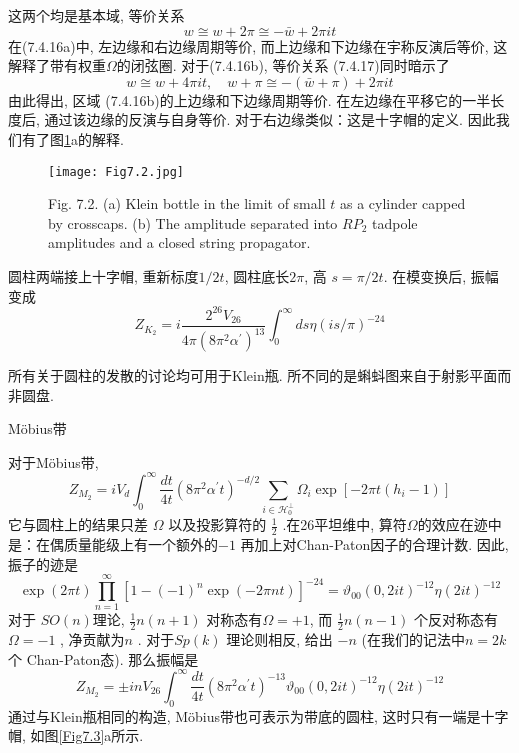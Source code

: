 这两个均是基本域, 等价关系
\begin{equation}
	w \cong w+2 \pi \cong-\bar{w}+2 \pi i t
\end{equation}
在(7.4.16a)中, 左边缘和右边缘周期等价, 而上边缘和下边缘在宇称反演后等价, 这解释了带有权重$\Omega $的闭弦圈. 对于(7.4.16b), 等价关系 (7.4.17)同时暗示了
\begin{equation}
	w \cong w+4 \pi i t, \quad w+\pi \cong-(\bar{w}+\pi)+2 \pi i t
\end{equation}
由此得出, 区域 (7.4.16b)的上边缘和下边缘周期等价. 在左边缘在平移它的一半长度后, 通过该边缘的反演与自身等价. 对于右边缘类似：这是十字帽的定义. 因此我们有了图\ref{Fig7.2}a的解释. \\
\begin{figure}
	\begin{center}
		\texttt{[image: Fig7.2.jpg]}\\
		\caption{Fig. 7.2. (a) Klein bottle in the limit of small $t$ as a cylinder capped by crosscaps. (b) The amplitude separated into $R P_{2}$ tadpole amplitudes and a closed string propagator.}\label{Fig7.2}
	\end{center}
\end{figure}

圆柱两端接上十字帽, 重新标度$1 / 2 t$, 圆柱底长$2 \pi$, 高 $s=\pi / 2 t$. 在模变换后, 振幅变成
\begin{equation}
	Z_{K_{2}}=i \frac{2^{26} V_{26}}{4 \pi\left(8 \pi^{2} \alpha^{\prime}\right)^{13}} \int_{0}^{\infty} d s \eta(i s / \pi)^{-24}
\end{equation}

所有关于圆柱的发散的讨论均可用于Klein瓶. 所不同的是蝌蚪图来自于射影平面而非圆盘.\\

\centerline{\Large Möbius带}
对于Möbius带,
\begin{equation}
	Z_{M_{2}}=i V_{d} \int_{0}^{\infty} \frac{d t}{4 t}\left(8 \pi^{2} \alpha^{\prime} t\right)^{-d / 2} \sum_{i \in \mathscr{H}_{0}^{\perp}} \Omega_{i} \exp \left[-2 \pi t\left(h_{i}-1\right)\right]
\end{equation}
它与圆柱上的结果只差 $\Omega$ 以及投影算符的 $\frac{1}{2}$ .在26平坦维中, 算符$\Omega$的效应在迹中是：在偶质量能级上有一个额外的$-1$ 再加上对Chan-Paton因子的合理计数. 因此, 振子的迹是
\begin{equation}
	\exp (2 \pi t) \prod_{n=1}^{\infty}\left[1-(-1)^{n} \exp (-2 \pi n t)\right]^{-24}=\vartheta_{00}(0,2 i t)^{-12} \eta(2 i t)^{-12}
\end{equation}
对于 $S O(n)$理论,  $\frac{1}{2} n(n+1)$ 对称态有$\Omega=+1$, 而 $\frac{1}{2} n(n-1)$ 个反对称态有 $\Omega=-1$ , 净贡献为$n$ . 对于$S p(k)$ 理论则相反, 给出 $-n$ (在我们的记法中$n=2 k$个 Chan-Paton态). 那么振幅是
\begin{equation}
	Z_{M_{2}}=\pm i n V_{26} \int_{0}^{\infty} \frac{d t}{4 t}\left(8 \pi^{2} \alpha^{\prime} t\right)^{-13} \vartheta_{00}(0,2 i t)^{-12} \eta(2 i t)^{-12}
\end{equation}
通过与Klein瓶相同的构造,  Möbius带也可表示为带底的圆柱, 这时只有一端是十字帽, 如图\ref{Fig7.3}a所示. 

